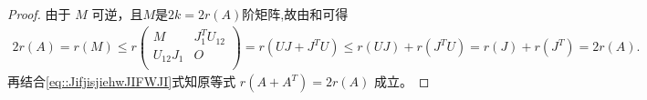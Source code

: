 \documentclass[../../main.tex]{subfiles}%
\begin{document}
\begin{proof}
由于 \(M\) 可逆，且$M$是$2k=2r(A)$阶矩阵,故由和可得
\begin{align*}
2r\left( A \right) =r\left( M \right) \leqslant r\left( \begin{matrix}
M&		J_{1}^{T}U_{12}\\
U_{12}J_1&		O\\
\end{matrix} \right) =r\left( UJ+J^TU \right) \leqslant r\left( UJ \right) +r\left( J^TU \right) =r\left( J \right) +r\left( J^T \right) =2r\left( A \right) .
\end{align*}
再结合\eqref{eq::JifjisjiehwJIFWJI}式知原等式 \(r(A+A^T)=2r(A)\) 成立。
\end{proof}
\end{document}
